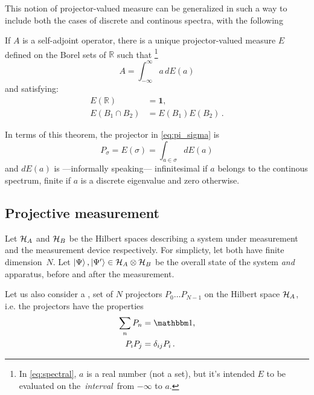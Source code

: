 This notion of projector-valued measure can be generalized
in such a way to include both the cases of discrete and continous spectra,
with the following \parencite{VonNeumann, Ballentine}
\begin{theorem}
  If $A$ is a self-adjoint operator,
  there is a unique projector-valued measure $E$
  defined on the Borel sets of $\mathbb{R}$
  such that
  \footnote{
    In \eqref{eq:spectral}, $a$ is a real number (not a set),
    but it's intended $E$ to be evaluated
    on the~\emph{interval}~from $-\infty$ to $a$.
  }
  \begin{equation}\label{eq:spectral}
    A=\int_{-\infty}^{\infty}a\, dE(a)
  \end{equation}
  and satisfying:
  \begin{align*}
    E(\mathbb{R})       & =\mathbf{1},\\
    E(B_{1}\cap B_{2}) & =E(B_{1})E(B_{2})\,.
  \end{align*}
\end{theorem}

In terms of this theorem, the projector in \eqref{eq:pi_sigma} is
\begin{equation}\label{eq:P_sigma_spectral}
  P_{\sigma} = E(\sigma) = \int_{a\in\sigma}dE(a)
\end{equation}
and $dE(a)$ is
---informally speaking---
infinitesimal if $a$ belongs to the continous spectrum,
finite if $a$ is a discrete eigenvalue
and zero otherwise.


\subsection{Projective measurement}

Let $\mathcal{H}_A$ and $\mathcal{H}_B$ be the Hilbert spaces describing
a system under measurement and the measurement device respectively.
For simplicty, let both have finite di\-mension~$N$.
Let $\ket{\Psi}, \ket{\Psi'} \in \mathcal{H}_{A} \otimes \mathcal{H}_{B}$
be the overall state of the
system \emph{and} apparatus, before and after the measurement.

Let us also consider a ,  set of $N$ projectors
$P_0 \dots P_{N-1}$ on the Hilbert space $\mathcal{H}_A$,
i.e. the projectors have the properties
\begin{align}
  \sum_n P_n  &= \idop \text{,}\\
  P_i P_j     &= \delta_{ij}P_i \, \text{.}
\end{align}

